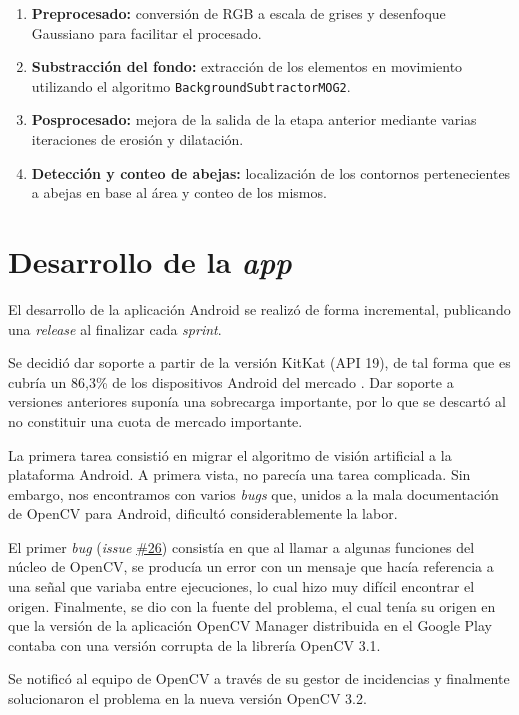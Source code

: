 \begin{enumerate}
\def\labelenumi{\arabic{enumi}.}
\tightlist
\item
  \textbf{Preprocesado:} conversión de RGB a escala de grises y
  desenfoque Gaussiano para facilitar el procesado.
\item
  \textbf{Substracción del fondo:} extracción de los elementos en
  movimiento utilizando el algoritmo \texttt{BackgroundSubtractorMOG2}.
\item
  \textbf{Posprocesado:} mejora de la salida de la etapa anterior
  mediante varias iteraciones de erosión y dilatación.
\item
  \textbf{Detección y conteo de abejas:} localización de los contornos
  pertenecientes a abejas en base al área y conteo de los mismos.
\end{enumerate}

\section{Desarrollo de la \emph{app}}\label{desarrollo-de-la-app}

El desarrollo de la aplicación Android se realizó de forma incremental,
publicando una \emph{release} al finalizar cada \emph{sprint}.

Se decidió dar soporte a partir de la versión KitKat (API 19), de tal
forma que es cubría un 86,3\% de los dispositivos Android del mercado
\citep{android:versions}. Dar soporte a versiones anteriores suponía una 
sobrecarga importante, por lo que se descartó al no constituir una cuota de
mercado importante.

La primera tarea consistió en migrar el algoritmo de visión artificial a
la plataforma Android. A primera vista, no parecía una tarea complicada.
Sin embargo, nos encontramos con varios \emph{bugs} que, unidos a la
mala documentación de OpenCV para Android, dificultó considerablemente
la labor.

El primer \emph{bug} (\emph{issue}
\href{https://github.com/davidmigloz/go-bees/issues/26}{\#26}) consistía
en que al llamar a algunas funciones del núcleo de OpenCV, se producía
un error con un mensaje que hacía referencia a una señal que variaba
entre ejecuciones, lo cual hizo muy difícil encontrar el origen.
Finalmente, se dio con la fuente del problema, el cual tenía su origen
en que la versión de la aplicación OpenCV Manager distribuida en el
Google Play contaba con una versión corrupta de la librería OpenCV 3.1.

Se notificó al equipo de OpenCV a través de su gestor de incidencias y
finalmente solucionaron el problema en la nueva versión OpenCV 3.2.

